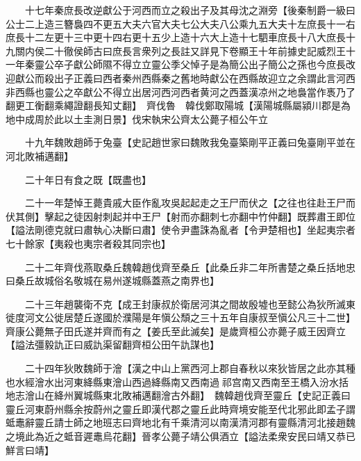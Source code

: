 　　十七年秦庶長改逆獻公于河西而立之殺出子及其母沈之淵旁【後秦制爵一級曰公士二上造三簪裊四不更五大夫六官大夫七公大夫八公乘九五大夫十左庶長十一右庶長十二左更十三中更十四右更十五少上造十六大上造十七駟車庶長十八大庶長十九關内侯二十徹侯師古曰庶長言衆列之長註又詳見下卷顯王十年前據史記威烈王十一年秦靈公卒子獻公師隰不得立立靈公季父悼子是為簡公出子簡公之孫也今庶長改迎獻公而殺出子正義曰西者秦州西縣秦之舊地時獻公在西縣故迎立之余謂此言河西非西縣也靈公之卒獻公不得立出居河西河西者黄河之西蓋漢凉州之地裊當作褭乃了翻更工衡翻乘繩證翻長知丈翻】　齊伐魯　韓伐鄭取陽城【漢陽城縣屬潁川郡是為地中成周於此以土圭測日景】伐宋執宋公齊太公薨子桓公午立

　　十九年魏敗趙師于兔臺【史記趙世家曰魏敗我兔臺築剛平正義曰兔臺剛平並在河北敗補邁翻】

　　二十年日有食之既【既盡也】

　　二十一年楚悼王薨貴戚大臣作亂攻吳起起走之王尸而伏之【之往也往赴王尸而伏其側】擊起之徒因射刺起并中王尸【射而亦翻刺七亦翻中竹仲翻】既葬肅王即位【謚法剛德克就曰肅執心决斷曰肅】使令尹盡誅為亂者【令尹楚相也】坐起夷宗者七十餘家【夷殺也夷宗者殺其同宗也】

　　二十二年齊伐燕取桑丘魏韓趙伐齊至桑丘【此桑丘非二年所書楚之桑丘括地忠曰桑丘故城俗名敬城在易州遂城縣蓋燕之南界也】

　　二十三年趙襲衛不克【成王封康叔於衛居河淇之間故殷墟也至懿公為狄所滅東徙度河文公徙居楚丘遂國於濮陽是年愼公頹之三十五年自康叔至愼公凡三十二世】　齊康公薨無子田氏遂并齊而有之【姜氏至此滅矣】是歲齊桓公亦薨子威王因齊立【謚法彊毅訅正曰威訅渠留翻齊桓公田午訅謀也】

　　二十四年狄敗魏師于澮【漢之中山上黨西河上郡自春秋以來狄皆居之此亦其種也水經澮水出河東絳縣東澮山西過絳縣南又西南過祁宫南又西南至王橋入汾水括地志澮山在絳州翼城縣東北敗補邁翻澮古外翻】　魏韓趙伐齊至靈丘【史記正義曰靈丘河東蔚州縣余按蔚州之靈丘即漢代郡之靈丘此時齊境安能至代北邪此即孟子謂蚳鼃辭靈丘請士師之地班志曰齊地北有千乘清河以南漢清河郡有靈縣清河北接趙魏之境此為近之蚳音遲鼃烏花翻】晉孝公薨子靖公俱酒立【謚法柔衆安民曰靖又恭已鮮言曰靖】

